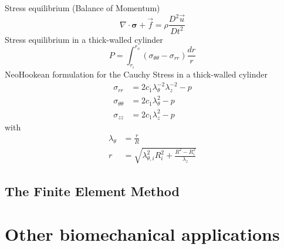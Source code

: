 \documentclass[../main.tex]{subfiles}
\begin{document}
Stress equilibrium (Balance of Momentum)
\begin{equation}
    \nabla \cdot \bm{\sigma} + \vec{f} = \rho \frac{D^2\vec{u}}{Dt^2}
\end{equation}
Stress equilibrium in a thick-walled cylinder
\begin{equation}
    P = \int_{r_i}^{r_o}(\sigma_{\theta\theta}-\sigma_{rr})\frac{dr}{r}
\end{equation}
NeoHookean formulation for the Cauchy Stress in a thick-walled cylinder
\begin{align}
    \sigma_{rr} & = 2c_1\lambda_{\theta}^{-2}\lambda_z^{-2}-p \\
    \sigma_{\theta\theta} & = 2c_1\lambda_{\theta}^{2}-p \\
    \sigma_{zz} & = 2c_1\lambda_z^{2}-p
\end{align}
with
\begin{align}
    \lambda_{\theta} & = \frac{r}{R}\\
    r & = \sqrt{\lambda_{\theta, i}^2R_i^2+\frac{R^2-R_i^2}{\lambda_z}}
\end{align}

\subsection{The Finite Element Method}

\section{Other biomechanical applications}
\end{document}

